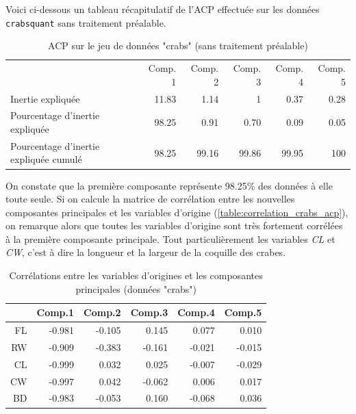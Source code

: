 \documentclass[a4paper,11pt]{report}
\begin{document}
Voici ci-dessous un tableau récapitulatif de l'ACP effectuée sur les données \texttt{crabsquant} sans traitement préalable.

\begin{table}[H]
	\centering
	\captionsetup{justification=centering, margin=2cm}
	\caption{ACP sur le jeu de données "crabs" (sans traitement préalable)}
	\label{table:acp_crabs_initial_data}
	\begin{tabular}{lrrrrr}
		& Comp. 1 & Comp. 2 & Comp. 3 & Comp. 4 & Comp. 5 \\
		Inertie expliquée & 11.83 & 1.14 & 1 & 0.37 & 0.28 \\
		Pourcentage d'inertie expliquée & 98.25 & 0.91 & 0.70 & 0.09 & 0.05 \\
		Pourcentage d'inertie expliquée cumulé & 98.25 & 99.16 & 99.86 & 99.95 & 100
	\end{tabular}
\end{table}

On constate que la première composante représente 98.25\% des données à elle toute seule. Si on calcule la matrice de corrélation entre les nouvelles composantes principales et les variables d'origine (\autoref{table:correlation_crabs_acp}), on remarque alors que toutes les variables d'origine sont très fortement corrélées à la première composante principale.
Tout particulièrement les variables \textit{CL} et \textit{CW}, c'est à dire la longueur et la largeur de la coquille des crabes.

\begin{table}[H]
	\centering
	\captionsetup{justification=centering, margin=2cm}
	\caption{Corrélations entre les variables d'origines et les composantes principales (données "crabs")}
	\label{table:correlation_crabs_acp}
	\begin{tabular}{r|rrrrr}
		& Comp.1 & Comp.2 & Comp.3 & Comp.4 & Comp.5 \\ 
		\hline
		FL & -0.981 & -0.105 & 0.145 & 0.077 & 0.010 \\ 
		RW & -0.909 & -0.383 & -0.161 & -0.021 & -0.015 \\ 
		CL & -0.999 & 0.032 & 0.025 & -0.007 & -0.029 \\ 
		CW & -0.997 & 0.042 & -0.062 & 0.006 & 0.017 \\ 
		BD & -0.983 & -0.053 & 0.160 & -0.068 & 0.036 \\ 
	\end{tabular}
\end{table}
\end{document}
